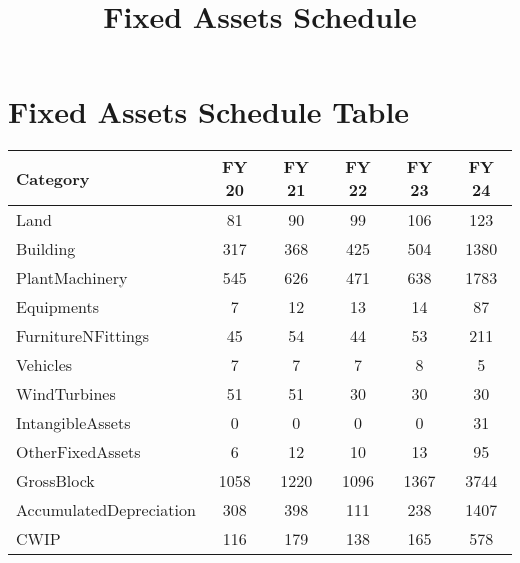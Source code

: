 \documentclass{article}
\begin{document}
\title{\textbf{Fixed Assets Schedule}}
\date{}
\maketitle

\section*{Fixed Assets Schedule Table}

\begin{tabularx}{\textwidth}{|X|c|c|c|c|c|}
    \hline
    \rowcolor{blue!20}
    \textbf{Category} & \textbf{FY 20} & \textbf{FY 21} & \textbf{FY 22} & \textbf{FY 23} & \textbf{FY 24} \\
    \hline
    
    Land &  81 &  90 &  99 &  106 &  123 &  \\
    \hline
    
    Building &  317 &  368 &  425 &  504 &  1380 &  \\
    \hline
    
    PlantMachinery &  545 &  626 &  471 &  638 &  1783 &  \\
    \hline
    
    Equipments &  7 &  12 &  13 &  14 &  87 &  \\
    \hline
    
    FurnitureNFittings &  45 &  54 &  44 &  53 &  211 &  \\
    \hline
    
    Vehicles &  7 &  7 &  7 &  8 &  5 &  \\
    \hline
    
    WindTurbines &  51 &  51 &  30 &  30 &  30 &  \\
    \hline
    
    IntangibleAssets &  0 &  0 &  0 &  0 &  31 &  \\
    \hline
    
    OtherFixedAssets &  6 &  12 &  10 &  13 &  95 &  \\
    \hline
    
    GrossBlock &  1058 &  1220 &  1096 &  1367 &  3744 &  \\
    \hline
    
    AccumulatedDepreciation &  308 &  398 &  111 &  238 &  1407 &  \\
    \hline
    
    CWIP &  116 &  179 &  138 &  165 &  578 &  \\
    \hline
    

\end{tabularx}
\end{document}
